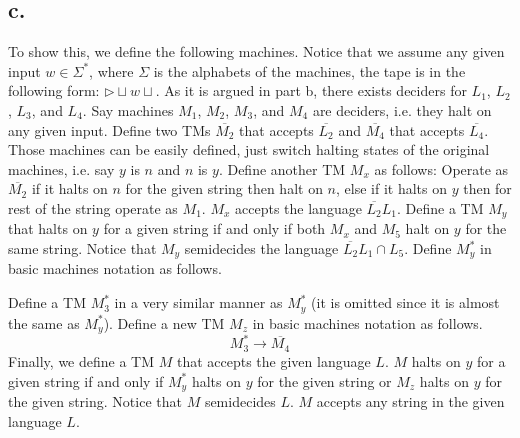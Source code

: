 \documentclass[12pt]{article}
\begin{document}
\subsection*{c.}
To show this, we define the following machines. Notice that we assume any given input $w \in \Sigma^*$, where $\Sigma$ is the alphabets of the machines, the tape is in the following form: $\triangleright \sqcup w \sqcup$. As it is argued in part b, there exists deciders for $L_1$, $L_2$, $L_3$, and $L_4$. Say machines $M_1$, $M_2$, $M_3$, and $M_4$ are deciders, i.e. they halt on any given input. Define two TMs $\overline{M_2}$ that accepts $\overline{L_2}$ and $\overline{M_4}$ that accepts $\overline{L_4}$. Those machines can be easily defined, just switch halting states of the original machines, i.e. say $y$ is $n$ and $n$ is $y$. Define another TM $M_x$ as follows: Operate as $\overline{M_2}$ if it halts on $n$ for the given string then halt on $n$, else if it halts on $y$ then for rest of the string operate as $M_1$. $M_x$ accepts the language $\overline{L_2}L_1$.  Define a TM $M_y$ that halts on $y$ for a given string if and only if both $M_x$ and $M_5$ halt on $y$ for the same string. Notice that $M_y$ semidecides the language $\overline{L_2}L_1 \cap L_5$. Define $M_y^*$ in basic machines notation as follows.
\begin{center}
\end{center}
Define a TM $M_3^*$ in a very similar manner as $M_y^*$ (it is omitted since it is almost the same as $M_y^*$).  Define a new TM $M_z$ in basic machines notation as follows.
\begin{equation*}
	M_3^* \rightarrow \overline{M_4}
\end{equation*}
Finally, we define a TM $M$ that accepts the given language $L$. $M$ halts on $y$ for a given string if and only if $M_y^*$ halts on $y$ for the given string or $M_z$  halts on $y$ for the given string. Notice that $M$ semidecides $L$. $M$ accepts any string in the given language $L$.
\end{document}
